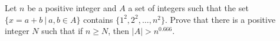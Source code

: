Let $n$ be a positive integer and $A$ a set of integers such that the set $\{x = a + b\ |\ a, b \in A\}$ contains $\{1^2, 2^2, \dots, n^2\}$. Prove that there is a positive integer $N$ such that if $n \ge N$, then $|A| > n^{0.666}$.